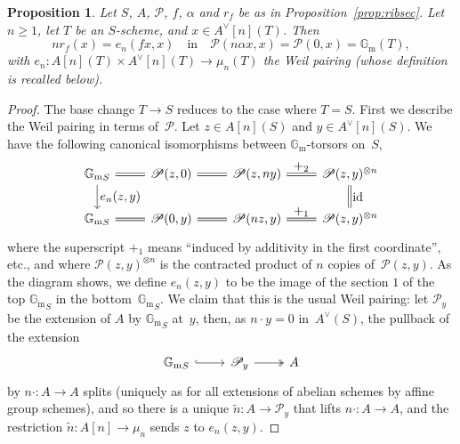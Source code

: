 \documentclass[JEP,XML,SOM,Unicode,NoFloatCountersInSection]{cedram}
\let\mathcal\mathscr
\let\oldvee\vee
\renewcommand{\vee}{{\scriptscriptstyle\oldvee}}
\theoremstyle{plain}
\newtheorem{Proposition}[subsection]{Proposition}
\theoremstyle{definition}
\numberwithin{equation}{subsection}
\renewcommand{\G}{\mathbb G}
\newcommand{\calP}{\mathcal{P}}
\newcommand{\Gm}{\G_{\mathrm{m}}}
\DeclareMathOperator{\id}{id}
\begin{document}
\begin{Proposition}\label{prop:ribsectors}
Let $S$, $A$, $\calP$, $f$, $\alpha$ and $r_f$ be as in
Proposition~\ref{prop:ribsec}. Let $n\geq1$, let $T$ be an
$S$-scheme, and $x\in A^\vee[n](T)$. Then
\[
nr_f(x)=e_n(fx,x)\quad \text{in}\quad \calP(n\alpha x,x)=\calP(0,x)=\Gm(T),
\]
with $e_n\colon A[n](T)\times A^\vee[n](T)\to \mu_n(T)$ the Weil
pairing (whose definition is recalled below).
\end{Proposition}
\begin{proof}
The base change $T\to S$ reduces to the case where $T=S$. First we
describe the Weil pairing in terms of~$\calP$. Let $z\in A[n](S)$ and
$y\in A^\vee[n](S)$. We have the following
canonical isomorphisms between $\Gm$-torsors on~$S$,
\[
\begin{tikzcd}
{\Gm}_S \arrow[r, equal] \arrow[d,"\textstyle{e_n(z,y)}"] & \calP(z,0) \arrow[r, equal]
& \calP(z,ny) \arrow[r,equal,"\textstyle+_2"]
& \calP(z,y) ^{\otimes n} \arrow[d,equal,"\textstyle\id"] \\
{\Gm}_S \arrow[r, equal]& \calP(0,y) \arrow[r, equal]
& \calP(nz,y) \arrow[r,equal,"\textstyle+_1"]
& \calP(z,y) ^{\otimes n}
\end{tikzcd}
\]
where the superscript $+_1$ means ``induced by additivity in the first
coordinate'', etc., and where $\calP(z,y)^{\otimes n}$ is the
contracted product of $n$ copies of~$\calP(z,y)$. As the diagram
shows, we define $e_n(z,y)$ to be the image of the section $1$ of the
top ${\Gm}_S$ in the bottom~${\Gm}_S$. We claim that this is the usual
Weil pairing: let $\calP_y$ be the extension of $A$ by ${\Gm}_S$
at~$y$, then, as $n{\cdot}y=0$ in~$A^\vee(S)$, the pullback of the
extension
\[
\begin{tikzcd}
{\Gm}_S \arrow[r, hook]
& \calP_y \arrow[r, two heads]
& A
\end{tikzcd}
\]
by $n{\cdot}\colon A\to A$ splits (uniquely as for all extensions of
abelian schemes by affine group schemes), and so
there is a unique $\tilde{n}\colon A\to \calP_y$ that
lifts $n{\cdot}\colon A\to A$, and the restriction $\tilde{n}\colon
A[n]\to\mu_n$ sends $z$ to $e_n(z,y)$.


\end{proof}
\end{document}
